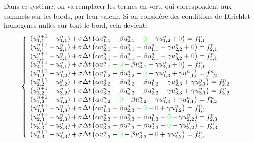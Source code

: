 \documentclass[11pt]{article}
\begin{document}
Dans ce système, on va remplacer les termes en vert, qui correspondent aux sommets sur les bords, par leur valeur. Si on considère des conditions de Dirichlet homogènes nulles sur tout le bord, cela devient:
\begin{equation}
\left\{
\begin{array}{l}
(u^{n+1}_{1,1}-u^{n}_{1,1}) + \sigma\Delta t\left(\alpha u^{n}_{1,1} + \beta u^{n}_{2,1} +  {\color{green}0} +  \gamma u^{n}_{1,2} +  {\color{green}0}\right) = f^{n}_{1,1} \\ 
(u^{n+1}_{2,1}-u^{n}_{2,1}) + \sigma\Delta t\left(\alpha u^{n}_{2,1} + \beta u^{n}_{3,1} +  \beta u^{n}_{1,1} +  \gamma u^{n}_{2,2} +  {\color{green}0}\right) = f^{n}_{2,1} \\ 
(u^{n+1}_{3,1}-u^{n}_{3,1}) + \sigma\Delta t\left(\alpha u^{n}_{3,1} + \beta u^{n}_{4,1} +  \beta u^{n}_{2,1} +  \gamma u^{n}_{3,2} +  {\color{green}0}\right) = f^{n}_{3,1} \\ 
(u^{n+1}_{4,1}-u^{n}_{4,1}) + \sigma\Delta t\left(\alpha u^{n}_{4,1} +  {\color{green}0} +  \beta u^{n}_{3,1} +  \gamma u^{n}_{4,2} +  {\color{green}0}\right) = f^{n}_{4,1} \\ 
(u^{n+1}_{1,2}-u^{n}_{1,2}) + \sigma\Delta t\left(\alpha u^{n}_{1,2} + \beta u^{n}_{2,2} +   {\color{green}0} +  \gamma u^{n}_{1,3} +  \gamma u^{n}_{1,1}\right) = f^{n}_{1,2} \\ 
(u^{n+1}_{2,2}-u^{n}_{2,2}) + \sigma\Delta t\left(\alpha u^{n}_{2,2} + \beta u^{n}_{3,2} +  \beta u^{n}_{1,2} +  \gamma u^{n}_{2,3} +  \gamma u^{n}_{2,1}\right) = f^{n}_{2,2} \\ 
(u^{n+1}_{3,2}-u^{n}_{3,2}) + \sigma\Delta t\left(\alpha u^{n}_{3,2} + \beta u^{n}_{4,2} +  \beta u^{n}_{2,2} +  \gamma u^{n}_{3,3} +  \gamma u^{n}_{3,1}\right) = f^{n}_{3,2} \\ 
(u^{n+1}_{4,2}-u^{n}_{4,2}) + \sigma\Delta t\left(\alpha u^{n}_{4,2} +  {\color{green}0} +  \beta u^{n}_{3,2} +  \gamma u^{n}_{4,3} +  \gamma u^{n}_{4,1}\right) = f^{n}_{4,2} \\ 
(u^{n+1}_{1,3}-u^{n}_{1,3}) + \sigma\Delta t\left(\alpha u^{n}_{1,3} + \beta u^{n}_{2,3} +  {\color{green}0} +  {\color{green}0} +  \gamma u^{n}_{1,2}\right) = f^{n}_{1,3} \\ 
(u^{n+1}_{2,3}-u^{n}_{2,3}) + \sigma\Delta t\left(\alpha u^{n}_{2,3} + \beta u^{n}_{3,3} +  \beta u^{n}_{1,3} +  {\color{green}0} +  \gamma u^{n}_{2,2}\right) = f^{n}_{2,3} \\ 
(u^{n+1}_{3,3}-u^{n}_{3,3}) + \sigma\Delta t\left(\alpha u^{n}_{3,3} + \beta u^{n}_{4,3} +  \beta u^{n}_{2,3} +  {\color{green}0} +  \gamma u^{n}_{3,2}\right) = f^{n}_{3,3} \\ 
(u^{n+1}_{4,3}-u^{n}_{4,3}) + \sigma\Delta t\left(\alpha u^{n}_{4,3} +  {\color{green}0} +  \beta u^{n}_{3,3} +  {\color{green}0} +  \gamma u^{n}_{4,2}\right) = f^{n}_{4,3} \\ 
\end{array}
\right.
\end{equation}
\end{document}
